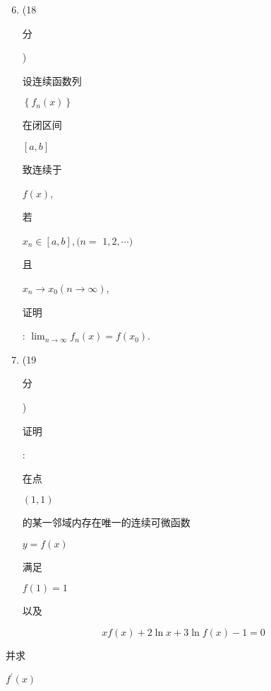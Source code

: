 \documentclass[10pt]{article}
\begin{document}
\begin{enumerate}
  \setcounter{enumi}{5}
  \item (18 \begin{CJK}{UTF8}{mj}分\end{CJK}) \begin{CJK}{UTF8}{mj}设连续函数列\end{CJK} $\left\{f_{n}(x)\right\}$ \begin{CJK}{UTF8}{mj}在闭区间\end{CJK} $[a, b]$ \begin{CJK}{UTF8}{mj}致连续于\end{CJK} $f(x)$, \begin{CJK}{UTF8}{mj}若\end{CJK} $x_{n} \in[a, b],(n=$ $1,2, \cdots)$ \begin{CJK}{UTF8}{mj}且\end{CJK} $x_{n} \rightarrow x_{0}(n \rightarrow \infty)$, \begin{CJK}{UTF8}{mj}证明\end{CJK}: $\lim _{n \rightarrow \infty} f_{n}(x)=f\left(x_{0}\right)$.

  \item (19 \begin{CJK}{UTF8}{mj}分\end{CJK}) \begin{CJK}{UTF8}{mj}证明\end{CJK}: \begin{CJK}{UTF8}{mj}在点\end{CJK} $(1,1)$ \begin{CJK}{UTF8}{mj}的某一邻域内存在唯一的连续可微函数\end{CJK} $y=f(x)$ \begin{CJK}{UTF8}{mj}满足\end{CJK} $f(1)=1$ \begin{CJK}{UTF8}{mj}以及\end{CJK}

\end{enumerate}
$$
x f(x)+2 \ln x+3 \ln f(x)-1=0
$$
\begin{CJK}{UTF8}{mj}并求\end{CJK} $f^{\prime}(x)$
\end{document}
